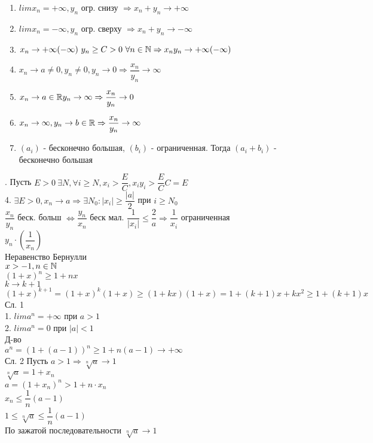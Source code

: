 \begin{enumerate}
	\item $lim x_n = +\infty, y_n $ огр. снизу $ \Rightarrow x_n + y_n \rightarrow +\infty $
	\item $lim x_n = -\infty, y_n $ огр. сверху $ \Rightarrow x_n + y_n \rightarrow -\infty $
	\item $ x_n \rightarrow +\infty (-\infty) \ y_n \geq C > 0 \ \forall n \in  \N \Rightarrow x_n y_n \rightarrow +\infty ( -\infty) $
	\item $ x_n \rightarrow a \neq 0, y_n \neq 0, y_n \rightarrow 0 \Rightarrow \dfrac{x_n}{y_n} \rightarrow \infty$
	\item $ x_n \rightarrow a \in \mathbb{R} y_n \rightarrow \infty \Rightarrow \dfrac{x_n}{y_n} \rightarrow 0 $
	\item $ x_n \rightarrow \infty, y_n \rightarrow b \in \mathbb{R}  \Rightarrow \dfrac{x_n}{y_n} \rightarrow \infty $ 
	\item $ (a_i) $ - бесконечно большая, $ (b_i) $ - ограниченная. Тогда $ (a_i + b_i) $ - бесконечно большая
\end{enumerate}

. Пусть $ E > 0 \  \exists N, \forall i \geq N, x_i > \dfrac{E}{C}, x_i y_i > \dfrac{E}{C} C = E $ \\
4. $ \exists E > 0, x_n \rightarrow a \Rightarrow \exists N_0 : |x_i| \geq \dfrac{|a|}{2} $ при  $ i \geq N_0$ \\
$ \dfrac{x_n}{y_n} $ беск. больш $ \Leftrightarrow \dfrac{y_n}{x_n} $ беск мал. $ \dfrac{1}{|x_i|} \leq \dfrac{2}{a} \Rightarrow \dfrac{1}{x_i}$ ограниченная \\
$ y_n \cdot \left( \dfrac{1}{x_n} \right)  $\\

Неравенство Бернулли \\
$ x > -1, n \in \mathbb{N} $ \\
$ (1+x)^n \geq 1 + nx $ \\
$ k \rightarrow k + 1 $ \\
$ (1+x)^{k+1} = (1+x)^k(1+x) \geq (1+kx)(1+x) = 1 + (k+1)x + kx^2 \geq 1 + (k+1)x $ \\
Сл. 1 \\
1. $ lim a^n = +\infty $ при $ a > 1 $ \\
2. $ lim a^n = 0$ при $ |a| < 1$ \\
Д-во \\
$ a^n = (1 + (a-1))^n \geq 1 + n(a-1) \rightarrow +\infty $\\
Сл. 2 Пусть $ a > 1 \Rightarrow \sqrt[n]{a} \rightarrow 1$\\
$ \sqrt[n]{a} = 1 + x_n $ \\
$ a = (1 + x_n) ^n > 1 + n \cdot x_n $ \\
$ x_n \leq \dfrac{1}{n} (a-1)  $ \\
$ 1 \leq \sqrt[n]{a} \leq  \dfrac{1}{n} (a-1) $ \\
По зажатой последовательности $ \sqrt[n]{a} \rightarrow 1 $\\

